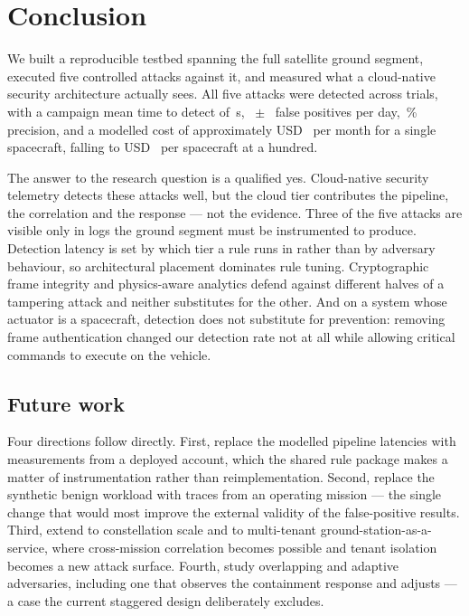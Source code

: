 \section{Conclusion}

We built a reproducible testbed spanning the full satellite ground segment,
executed five controlled attacks against it, and measured what a cloud-native
security architecture actually sees. All five attacks were detected across
\ResTrials{} trials, with a campaign mean time to detect of \ResTTDMean{}\,s,
\ResFPDay{}~$\pm$~\ResFPDayCI{} false positives per day, \ResPrecision{}\,\%
precision, and a modelled cost of approximately USD~\CostMonthly{} per month for
a single spacecraft, falling to USD~\CostPerHundred{} per spacecraft at a hundred.

The answer to the research question is a qualified yes. Cloud-native security
telemetry detects these attacks well, but the cloud tier contributes the
pipeline, the correlation and the response --- not the evidence. Three of the
five attacks are visible only in logs the ground segment must be instrumented to
produce. Detection latency is set by which tier a rule runs in rather than by
adversary behaviour, so architectural placement dominates rule tuning.
Cryptographic frame integrity and physics-aware analytics defend against
different halves of a tampering attack and neither substitutes for the other. And
on a system whose actuator is a spacecraft, detection does not substitute for
prevention: removing frame authentication changed our detection rate not at all
while allowing critical commands to execute on the vehicle.

\subsection*{Future work}

Four directions follow directly. First, replace the modelled pipeline latencies
with measurements from a deployed account, which the shared rule package makes a
matter of instrumentation rather than reimplementation. Second, replace the
synthetic benign workload with traces from an operating mission --- the single
change that would most improve the external validity of the false-positive
results. Third, extend to constellation scale and to multi-tenant
ground-station-as-a-service, where cross-mission correlation becomes possible and
tenant isolation becomes a new attack surface. Fourth, study overlapping and
adaptive adversaries, including one that observes the containment response and
adjusts --- a case the current staggered design deliberately excludes.

